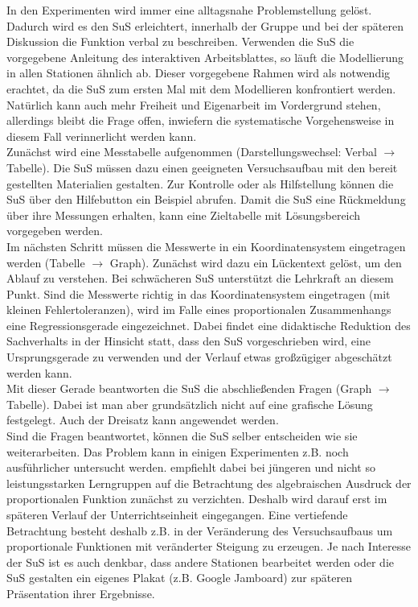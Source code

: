 \documentclass[../main.tex]{subfiles}
\begin{document}
In den Experimenten wird immer eine alltagsnahe Problemstellung gelöst. Dadurch wird es den SuS erleichtert, innerhalb der Gruppe und bei der späteren Diskussion die Funktion verbal zu beschreiben. Verwenden die SuS die vorgegebene Anleitung des interaktiven Arbeitsblattes, so läuft die Modellierung in allen Stationen ähnlich ab. Dieser vorgegebene Rahmen wird als notwendig erachtet, da die SuS zum ersten Mal mit dem Modellieren konfrontiert werden. Natürlich kann auch mehr Freiheit und Eigenarbeit im Vordergrund stehen, allerdings bleibt die Frage offen, inwiefern die systematische Vorgehensweise in diesem Fall verinnerlicht werden kann.\\
Zunächst wird eine Messtabelle aufgenommen (Darstellungswechsel: Verbal $\rightarrow$ Tabelle). Die SuS müssen dazu einen geeigneten Versuchsaufbau mit den bereit gestellten Materialien gestalten. Zur Kontrolle oder als Hilfstellung können die SuS über den Hilfebutton ein Beispiel abrufen. Damit die SuS eine Rückmeldung über ihre Messungen erhalten, kann eine Zieltabelle mit Lösungsbereich vorgegeben werden.\\
Im nächsten Schritt müssen die Messwerte in ein Koordinatensystem eingetragen werden (Tabelle $\rightarrow$ Graph). Zunächst wird dazu ein Lückentext gelöst, um den Ablauf zu verstehen. Bei schwächeren SuS unterstützt die Lehrkraft an diesem Punkt. Sind die Messwerte richtig in das Koordinatensystem eingetragen (mit kleinen Fehlertoleranzen), wird im Falle eines proportionalen Zusammenhangs eine Regressionsgerade eingezeichnet. Dabei findet eine didaktische Reduktion des Sachverhalts in der Hinsicht statt, dass den SuS vorgeschrieben wird, eine Ursprungsgerade zu verwenden und der Verlauf etwas großzügiger abgeschätzt werden kann.\\
Mit dieser Gerade beantworten die SuS die abschließenden Fragen (Graph $\rightarrow$ Tabelle). Dabei ist man aber grundsätzlich nicht auf eine grafische Lösung festgelegt. Auch der Dreisatz kann angewendet werden.\\
Sind die Fragen beantwortet, können die SuS selber entscheiden wie sie weiterarbeiten. Das Problem kann in einigen Experimenten z.B. noch ausführlicher untersucht werden. \cite{Beckmann2009} empfiehlt dabei bei jüngeren und nicht so leistungsstarken Lerngruppen auf die Betrachtung des algebraischen Ausdruck der proportionalen Funktion zunächst zu verzichten. Deshalb wird darauf erst im späteren Verlauf der Unterrichtseinheit eingegangen. Eine vertiefende Betrachtung besteht deshalb z.B. in der Veränderung des Versuchsaufbaus um proportionale Funktionen mit veränderter Steigung zu erzeugen. Je nach Interesse der SuS ist es auch denkbar, dass andere Stationen bearbeitet werden oder die SuS gestalten ein eigenes Plakat (z.B. Google Jamboard) zur späteren Präsentation ihrer Ergebnisse.\\
\end{document}
